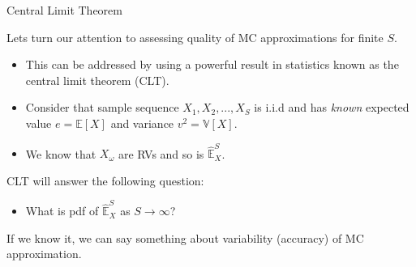 \documentclass[handout,9pt]{beamer}
\begin{document}
%
\begin{frame}{Central Limit Theorem}

Lets turn our attention to assessing quality of MC approximations for finite $S$. 
\begin{itemize}
\setlength{\itemsep}{10pt}
\item This can be addressed by using a powerful result in statistics known as the central limit theorem (CLT). 
\item Consider that sample sequence $X_1,X_2,...,X_S$ is i.i.d and has {\em known} expected value $e=\mathbb{E}[X]$ and variance $v^2=\mathbb{V}[X]$. 

\item We know that $X_\omega$ are RVs and so is $\hat{\mathbb{E}}_X^S$. 
\end{itemize}

CLT will answer the following question:
\begin{block}{}
\begin{itemize}
\item What is pdf of $\hat{\mathbb{E}}_X^S$ as $S\to \infty$?  
\end{itemize}
\end{block}
If we know it, we can say something about variability (accuracy) of MC  approximation. 

\end{frame}
\end{document}
